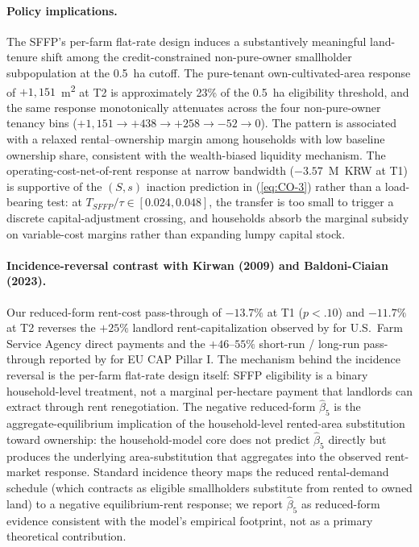 \documentclass[12pt, a4paper]{article}
\begin{document}
\paragraph{Policy implications.} The SFFP's per-farm flat-rate design induces a substantively meaningful land-tenure shift among the credit-constrained non-pure-owner smallholder subpopulation at the 0.5~ha cutoff. The pure-tenant own-cultivated-area response of $+1{,}151$~m\textsuperscript{2} at T2 is approximately 23\% of the 0.5~ha eligibility threshold, and the same response monotonically attenuates across the four non-pure-owner tenancy bins ($+1{,}151 \to +438 \to +258 \to -52 \to 0$). The pattern is associated with a relaxed rental--ownership margin among households with low baseline ownership share, consistent with the wealth-biased liquidity mechanism. The operating-cost-net-of-rent response at narrow bandwidth ($-3.57$~M~KRW at T1) is supportive of the $(S,s)$ inaction prediction in (\ref{eq:CO-3}) rather than a load-bearing test: at $T_{SFFP}/\tau \in [0.024, 0.048]$, the transfer is too small to trigger a discrete capital-adjustment crossing, and households absorb the marginal subsidy on variable-cost margins rather than expanding lumpy capital stock.

\paragraph{Incidence-reversal contrast with Kirwan (2009) and Baldoni-Ciaian (2023).} Our reduced-form rent-cost pass-through of $-13.7\%$ at T1 ($p < .10$) and $-11.7\%$ at T2 reverses the $+25\%$ landlord rent-capitalization observed by \citet{Kirwan2009_rentcap} for U.S.\ Farm Service Agency direct payments and the $+46$--$55\%$ short-run / long-run pass-through reported by \citet{BaldoniCiaian2023_eucap} for EU CAP Pillar I. The mechanism behind the incidence reversal is the per-farm flat-rate design itself: SFFP eligibility is a binary household-level treatment, not a marginal per-hectare payment that landlords can extract through rent renegotiation. The negative reduced-form $\hat\beta_5$ is the aggregate-equilibrium implication of the household-level rented-area substitution toward ownership: the household-model core does not predict $\hat\beta_5$ directly but produces the underlying area-substitution that aggregates into the observed rent-market response. Standard incidence theory \citep{Floyd1965_incidence, AlstonJames2002_incidence} maps the reduced rental-demand schedule (which contracts as eligible smallholders substitute from rented to owned land) to a negative equilibrium-rent response; we report $\hat\beta_5$ as reduced-form evidence consistent with the model's empirical footprint, not as a primary theoretical contribution.
\end{document}
